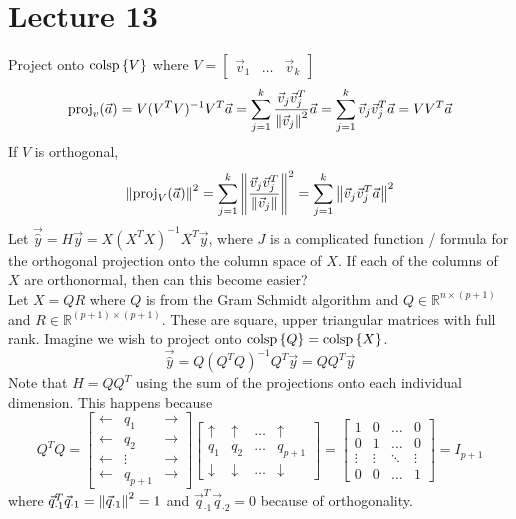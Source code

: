 \documentclass[12pt]{article}
\begin{document}
\section{Lecture 13} 
Project onto $\mathrm{colsp}\left\{ V \right\}$ where $V = \begin{bmatrix} \vec{v}_1 & \dots & \vec{v}_k \end{bmatrix}$ 
$$ \text{proj}_{ v } ( \vec{a} ) = V(V^TV)^{-1}V^T\vec{a} = \sum_{j=1}^k \frac{\vec{v}_j\vec{v}_j^T}{\norm{\vec{v}_j}^2} \vec{a} = \sum_{j=1}^k \vec{v}_j\vec{v}_j^T\vec{a} = VV^T\vec{a}$$ 
If $V$ is orthogonal, 
$$\norm{\text{proj}_{ V } ( \vec{a} )}^2 = \sum_{j=1}^k \norm{\frac{\vec{v}_j \vec{v}_j^T}{\norm{\vec{v}_j}}}^2 = \sum_{j=1}^k \norm{\vec{v}_j \vec{v}_j^T \vec{a}}^2$$ 
Let $\vec{\hat{y}} = H\vec{y} = X(X^TX)^{-1}X^T\vec{y}$, where $J$ is a complicated function / formula for the orthogonal projection onto the column space of $X$. If each of the columns of $X$ are orthonormal, then can this become easier? \\
Let $X = QR$ where $Q$ is from the Gram Schmidt algorithm and $Q \in \mathbb{R}^{n \times (p+1)}$ and $R \in \mathbb{R}^{(p+1) \times (p+1)}$. These are square, upper triangular matrices with full rank. Imagine we wish to project onto $\mathrm{colsp}\left\{ Q \right\} = \mathrm{colsp}\left\{ X \right\}$. 
$$\vec{\hat{y}} = Q(Q^TQ)^{-1}Q^T\vec{y} = QQ^T\vec{y}$$
Note that $H = QQ^T$ using the sum of the projections onto each individual dimension. This happens because 
$$Q^TQ = \begin{bmatrix} \leftarrow & q_1 & \rightarrow \\ \leftarrow & q_2 & \rightarrow \\ \leftarrow & \vdots & \rightarrow \\ \leftarrow & q_{p+1} & \rightarrow \end{bmatrix} \begin{bmatrix} \uparrow & \uparrow & \dots & \uparrow \\ q_1 & q_2 & \dots & q_{p+1} \\ \downarrow & \downarrow & \dots & \downarrow \end{bmatrix} = \begin{bmatrix} 1 & 0 & \dots & 0 \\ 0 & 1 & \dots & 0 \\ \vdots & \vdots & \ddots & \vdots \\ 0 & 0 & \dots & 1 \end{bmatrix} = I_{p+1} $$ where $\vec{q}_{\cdot 1}^T \vec{q}_{\cdot 1} = \norm{\vec{q}_{\cdot 1}}^2 = 1$ and $\vec{q}_{\cdot 1}^T \vec{q}_{\cdot 2} = 0$ because of orthogonality. \\~\\
\end{document}
